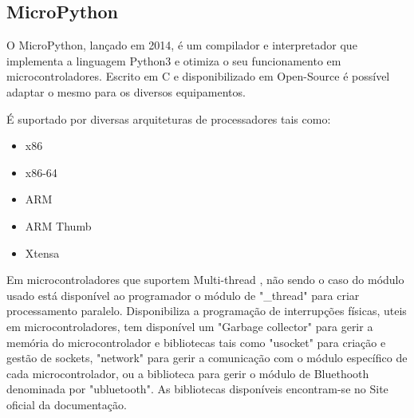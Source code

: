 \subsection {MicroPython}
\par O MicroPython\cite{MicroPython}, lançado em 2014, é um compilador e interpretador que implementa a linguagem Python3 e otimiza o seu funcionamento em microcontroladores. Escrito em C e disponibilizado em Open-Source é possível adaptar o mesmo para os diversos equipamentos. \par
É suportado por diversas arquiteturas de processadores tais como:
\par
\begin{itemize}
\item x86
\item x86-64
\item ARM
\item ARM Thumb
\item Xtensa
\end{itemize}
\par
Em microcontroladores que suportem Multi-thread , não sendo o caso do módulo usado está disponível ao programador o módulo de "\_thread" para criar processamento paralelo. Disponibiliza a programação de interrupções físicas, uteis em microcontroladores, tem disponível um "Garbage collector" para gerir a memória do microcontrolador e bibliotecas tais como "usocket" para criação e gestão de sockets, "network" para gerir a comunicação com o módulo específico de cada microcontrolador, ou a biblioteca para gerir o módulo de Bluethooth denominada por "ubluetooth". As bibliotecas disponíveis encontram-se no Site oficial da documentação\cite{micropython_lib}. 

